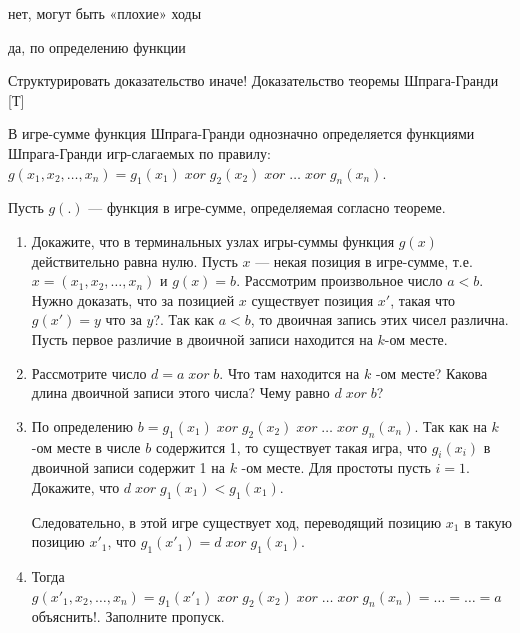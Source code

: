 \begin{problem}
\begin{sol}
\item нет, могут быть «плохие» ходы \par
\item да, по определению функции
\end{sol}
\end{problem}



\begin{problem} {\red  Структурировать доказательство иначе!}
 Доказательство теоремы Шпрага-Гранди [Т]\par
{}\par
В игре-сумме функция Шпрага-Гранди однозначно определяется функциями Шпрага-Гранди игр-слагаемых по правилу:  $g\left(x_{1},x_{2},\ldots,x_{n} \right)=g_{1} \left(x_{1} \right)\; xor\; g_{2} \left(x_{2} \right)\; xor\; \ldots \; xor\; g_{n} \left(x_{n} \right)$.
\par
Пусть  $g\left(.\right)$  — функция в игре-сумме, определяемая согласно теореме.
\begin{enumerate}
\item 	Докажите, что в терминальных узлах игры-суммы функция  $g\left(x\right)$  действительно равна нулю.
Пусть  $x$  — некая позиция в игре-сумме, т.е.  $x=\left(x_{1},x_{2},\ldots,x_{n} \right)$  и  $g\left(x\right)=b$. Рассмотрим произвольное число  $a<b$. Нужно доказать, что за позицией  $x$  существует позиция  $x'$, такая что  $g\left(x'\right)=y$ {\red что за $y$?}.
Так как  $a<b$, то двоичная запись этих чисел различна. Пусть первое различие в двоичной записи находится на  $k$-ом месте.\par
\item	Рассмотрите число  $d=a\; xor\; b$. Что там находится на  $k$ -ом месте? Какова длина двоичной записи этого числа? Чему равно  $d\; xor\; b$?
\item 	По определению  $b=g_{1} \left(x_{1} \right)\; xor\; g_{2} \left(x_{2} \right)\; xor\; \ldots \; xor\; g_{n} \left(x_{n} \right)$. Так как на  $k$ -ом месте в числе  $b$  содержится 1, то существует такая игра, что  $g_{i} \left(x_{i} \right)$  в двоичной записи содержит 1 на  $k$ -ом месте. Для простоты пусть  $i=1$. Докажите, что  $d\; xor\; g_{1} \left(x_{1} \right)<g_{1} \left(x_{1} \right)$.\par
Следовательно, в этой игре существует ход, переводящий позицию  $x_{1} $  в такую позицию $x'_{1} $, что  $g_{1} \left(x'_{1} \right)=d\; xor\; g_{1} \left(x_{1} \right)$.
\item	Тогда  $g\left(x'_{1},x_{2},\ldots,x_{n} \right)=g_{1} \left(x'_{1} \right)\; xor\; g_{2} \left(x_{2} \right)\; xor\; \ldots \; xor\; g_{n} \left(x_{n} \right)=\ldots =\ldots =a$ {\red объяснить!}. Заполните пропуск.

\end{enumerate}
\end{problem}
